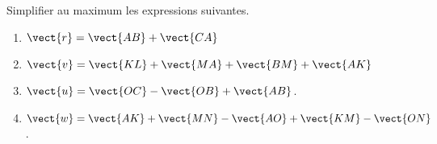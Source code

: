 
\begin{exercice}\label{exosmath-0067}

Simplifier au maximum les expressions suivantes.
\begin{enumerate}
    \item
        \( \vect{ r }=\vect{ AB }+\vect{ CA }\)
    \item
        \( \vect{ v }=\vect{ KL }+\vect{ MA }+\vect{ BM }+\vect{ AK }\)
    \item
        \( \vect{ u }=\vect{ OC }-\vect{ OB }+\vect{ AB }\).
    \item
        \( \vect{ w }=\vect{ AK }+\vect{ MN }-\vect{ AO }+\vect{ KM }-\vect{ ON }\).
\end{enumerate}


\end{exercice}
